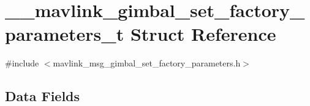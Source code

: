 \hypertarget{struct____mavlink__gimbal__set__factory__parameters__t}{\section{\+\_\+\+\_\+mavlink\+\_\+gimbal\+\_\+set\+\_\+factory\+\_\+parameters\+\_\+t Struct Reference}
\label{struct____mavlink__gimbal__set__factory__parameters__t}
}


{\ttfamily \#include $<$mavlink\+\_\+msg\+\_\+gimbal\+\_\+set\+\_\+factory\+\_\+parameters.\+h$>$}

\subsection*{Data Fields}
